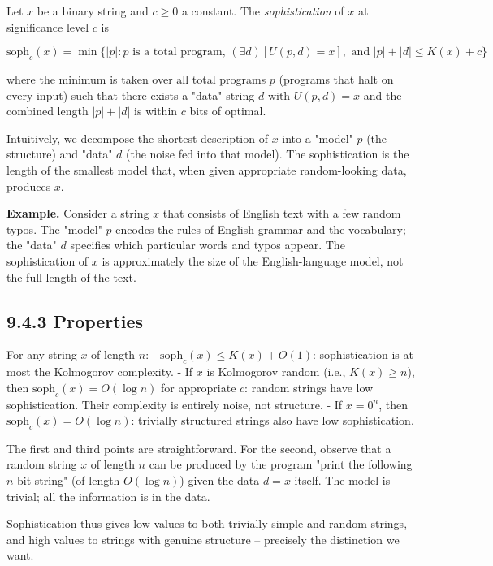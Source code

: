 \begin{definition}
Let $x$ be a binary string and $c \geq 0$ a constant. The \textit{sophistication} of $x$ at significance level $c$ is

\[\text{soph}_c(x) = \min \{ |p| : p \text{ is a total program, } (\exists d)[U(p, d) = x], \text{ and } |p| + |d| \leq K(x) + c \} \]

where the minimum is taken over all total programs $p$ (programs that halt on every input) such that there exists a "data" string $d$ with $U(p, d) = x$ and the combined length $|p| + |d|$ is within $c$ bits of optimal.

Intuitively, we decompose the shortest description of $x$ into a "model" $p$ (the structure) and "data" $d$ (the noise fed into that model). The sophistication is the length of the smallest model that, when given appropriate random-looking data, produces $x$.
\end{definition}

\textbf{Example.} Consider a string $x$ that consists of English text with a few random typos. The "model" $p$ encodes the rules of English grammar and the vocabulary; the "data" $d$ specifies which particular words and typos appear. The sophistication of $x$ is approximately the size of the English-language model, not the full length of the text.

\subsection{9.4.3 Properties}

\begin{proposition}
For any string $x$ of length $n$:
- $\text{soph}_c(x) \leq K(x) + O(1)$: sophistication is at most the Kolmogorov complexity.
- If $x$ is Kolmogorov random (i.e., $K(x) \geq n$), then $\text{soph}_c(x) = O(\log n)$ for appropriate $c$: random strings have low sophistication. Their complexity is entirely noise, not structure.
- If $x = 0^n$, then $\text{soph}_c(x) = O(\log n)$: trivially structured strings also have low sophistication.

The first and third points are straightforward. For the second, observe that a random string $x$ of length $n$ can be produced by the program "print the following $n$-bit string" (of length $O(\log n)$) given the data $d = x$ itself. The model is trivial; all the information is in the data.

Sophistication thus gives low values to both trivially simple and random strings, and high values to strings with genuine structure -- precisely the distinction we want.
\end{proposition}

